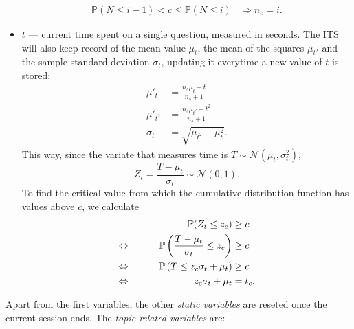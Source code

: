 \documentclass{article}
\newcommand{\0}{\mathbbold{0}}
\newcommand{\1}{\mathds{1}}
\newcommand{\LRA}{\Leftrightarrow\mkern40mu}
\begin{document}
\begin{itemize}
\begin{align*}
        \mathbb{P}(N \le i-1) < c \le \mathbb{P}(N \le i) &\Rightarrow n_c = i.
    \end{align*}
    \item $t$ — current time spent on a single question, measured in seconds. The ITS will also keep record of the mean value $\mu_t$, the mean of the squares $\mu_{t^2}$ and the sample standard deviation $\sigma_t$, updating it everytime a new value of $t$ is stored:
    \begin{align*}
        \mu'_t &= \frac{n_s\mu_t + t}{n_s + 1} \\
        \mu'_{t^2} &= \frac{n_s\mu_{t^2} + t^2}{n_s + 1} \\
        \sigma_t &= \sqrt{\mu_{t^2} - \mu_t^2}.
    \end{align*}
    This way, since the variate that measures time is $T \sim \mathcal{N}(\mu_t, \sigma^2_t)$,
    $$ Z_t = \frac{T-\mu_t}{\sigma_t} \sim \mathcal{N}(0,1). $$
    To find the critical value from which the cumulative distribution function has values above $c$, we calculate
    \begin{alignat*}{2}
        && \mathbb{P}(Z_t \le z_c) &\ge c \\
        \LRA && \mathbb{P}\left(\frac{T-\mu_t}{\sigma_t} \le z_c\right) &\ge c \\
        \LRA && \mathbb{P}\left(T \le z_c\sigma_t + \mu_t\right) &\ge c \\
        \LRA && z_c\sigma_t + \mu_t &= t_c.
    \end{alignat*}
\end{itemize}
Apart from the first variables, the other \textsl{static variables} are reseted once the current session ends. The \textsl{topic related variables} are:
\end{document}
